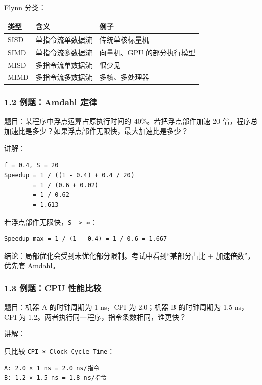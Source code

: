 \documentclass[
]{ctexart}
\newcommand{\passthrough}[1]{#1}
\newcounter{none} %
\begin{document}
Flynn 分类：

{\def\LTcaptype{none} %
\begin{longtable}[]{@{}lll@{}}
\toprule\noalign{}
类型 & 含义 & 例子 \\
\midrule\noalign{}
\endhead
\bottomrule\noalign{}
\endlastfoot
SISD & 单指令流单数据流 & 传统单核标量机 \\
SIMD & 单指令流多数据流 & 向量机、GPU 的部分执行模型 \\
MISD & 多指令流单数据流 & 很少见 \\
MIMD & 多指令流多数据流 & 多核、多处理器 \\
\end{longtable}
}

\subsubsection{1.2 例题：Amdahl
定律}\label{ux4f8bux9898amdahl-ux5b9aux5f8b}

题目：某程序中浮点运算占原执行时间的 40\%。若把浮点部件加速 20
倍，程序总加速比是多少？如果浮点部件无限快，最大加速比是多少？

讲解：

\begin{lstlisting}
f = 0.4, S = 20
Speedup = 1 / ((1 - 0.4) + 0.4 / 20)
        = 1 / (0.6 + 0.02)
        = 1 / 0.62
        = 1.613
\end{lstlisting}

若浮点部件无限快，\passthrough{\lstinline!S -> ∞!}：

\begin{lstlisting}
Speedup_max = 1 / (1 - 0.4) = 1 / 0.6 = 1.667
\end{lstlisting}

结论：局部优化会受到未优化部分限制。考试中看到``某部分占比 +
加速倍数''，优先套 Amdahl。

\subsubsection{1.3 例题：CPU
性能比较}\label{ux4f8bux9898cpu-ux6027ux80fdux6bd4ux8f83}

题目：机器 A 的时钟周期为 1 ns，CPI 为 2.0；机器 B 的时钟周期为 1.5
ns，CPI 为 1.2。两者执行同一程序，指令条数相同，谁更快？

讲解：

只比较 \passthrough{\lstinline!CPI × Clock Cycle Time!}：

\begin{lstlisting}
A: 2.0 × 1 ns = 2.0 ns/指令
B: 1.2 × 1.5 ns = 1.8 ns/指令
\end{lstlisting}
\end{document}

